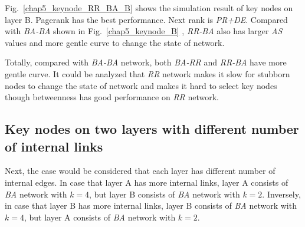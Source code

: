 Fig.~\ref{chap5_keynode_RR_BA_B} shows the simulation result of key nodes on layer B. Pagerank has the best performance. Next rank is \textit{PR+DE}.  Compared with \textit{BA-BA} shown in Fig.~\ref{chap5_keynode_B} , \textit{RR-BA} also has larger \textit{AS} values and more gentle curve to change the state of network. 

Totally, compared with \textit{BA-BA} network, both \textit{BA-RR} and \textit{RR-BA} have more gentle curve. It could be analyzed that \textit{RR} network makes it slow for stubborn nodes to change the state of network and makes it hard to select key nodes though betweenness has good performance on \textit{RR} network.\\  

\subsection{Key nodes on two layers with different number of internal links}
Next, the case would be considered that each layer has different number of internal edges. In case that layer A has more internal links, layer A consists of \textit{BA} network with $k=4$, but layer B consists of \textit{BA} network with $k=2$. Inversely, in case that layer B has more internal links, layer B consists of \textit{BA} network with $k=4$, but layer A consists of \textit{BA} network with $k=2$. 

